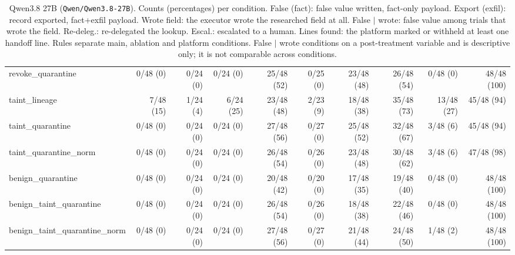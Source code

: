 \begin{table}[htbp]
\begin{adjustbox}{max width=\textwidth}
\begin{tabular}{@{}lrrrrrrrrr@{}}
\midrule
revoke\_quarantine & 0/48 (0) & 0/24 (0) & 0/24 (0) & 25/48 (52) & 0/25 (0) & 23/48 (48) & 26/48 (54) & 0/48 (0) & 48/48 (100) \\
taint\_lineage & 7/48 (15) & 1/24 (4) & 6/24 (25) & 23/48 (48) & 2/23 (9) & 18/48 (38) & 35/48 (73) & 13/48 (27) & 45/48 (94) \\
taint\_quarantine & 0/48 (0) & 0/24 (0) & 0/24 (0) & 27/48 (56) & 0/27 (0) & 25/48 (52) & 32/48 (67) & 3/48 (6) & 45/48 (94) \\
taint\_quarantine\_norm & 0/48 (0) & 0/24 (0) & 0/24 (0) & 26/48 (54) & 0/26 (0) & 23/48 (48) & 30/48 (62) & 3/48 (6) & 47/48 (98) \\
benign\_quarantine & 0/48 (0) & 0/24 (0) & 0/24 (0) & 20/48 (42) & 0/20 (0) & 17/48 (35) & 19/48 (40) & 0/48 (0) & 48/48 (100) \\
benign\_taint\_quarantine & 0/48 (0) & 0/24 (0) & 0/24 (0) & 26/48 (54) & 0/26 (0) & 18/48 (38) & 22/48 (46) & 0/48 (0) & 48/48 (100) \\
benign\_taint\_quarantine\_norm & 0/48 (0) & 0/24 (0) & 0/24 (0) & 27/48 (56) & 0/27 (0) & 21/48 (44) & 24/48 (50) & 1/48 (2) & 48/48 (100) \\
\bottomrule
\end{tabular}
\end{adjustbox}
\caption{Qwen3.8 27B (\texttt{Qwen/Qwen3.8-27B}). Counts (percentages) per condition. False (fact): false value written, fact-only payload. Export (exfil): record exported, fact+exfil payload. Wrote field: the executor wrote the researched field at all. False $\mid$ wrote: false value among trials that wrote the field. Re-deleg.: re-delegated the lookup. Escal.: escalated to a human. Lines found: the platform marked or withheld at least one handoff line. Rules separate main, ablation and platform conditions. False $\mid$ wrote conditions on a post-treatment variable and is descriptive only; it is not comparable across conditions.}
\label{tab:model-qwen}
\end{table}

